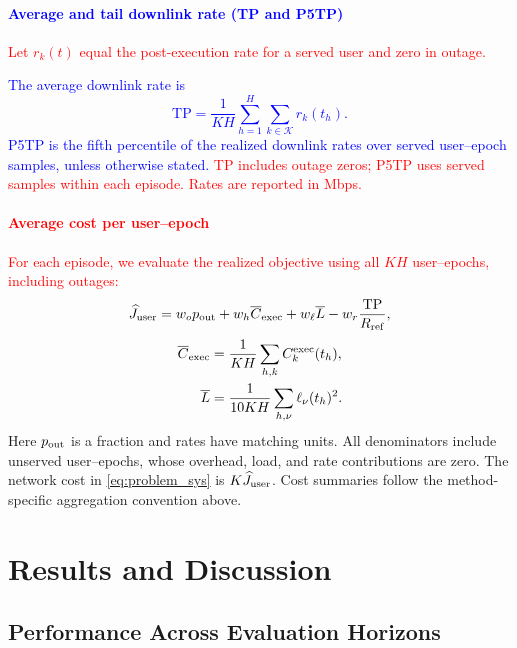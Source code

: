 \documentclass[10pt,letterpaper,journal]{IEEEtran}
\newcommand{\revnew}[1]{\textcolor{red}{#1}}
\begin{document}
\paragraph{\textcolor{blue}{Average and tail downlink rate (TP and P5TP)}}

\revnew{Let $r_k(t)$ equal the post-execution rate for a served user and zero in outage.}

\textcolor{blue}{The average downlink rate is
\begin{equation}
\mathrm{TP}
=
\frac{1}{KH}
\sum_{h=1}^{H}\sum_{k\in\mathcal K}r_k(t_h).
\end{equation}
P5TP is the fifth percentile of the realized downlink rates over served user--epoch samples, unless otherwise stated.}
\revnew{TP includes outage zeros; P5TP uses served samples within each episode. Rates are reported in Mbps.}


\paragraph{\revnew{Average cost per user--epoch}}
\revnew{For each episode, we evaluate the realized objective using all $KH$ user--epochs, including outages:}
\begingroup\color{red}
\[
\widehat J_{\rm user}
=w_o p_{\rm out}+w_h\overline C_{\rm exec}
+w_\ell\overline L-w_r\frac{\mathrm{TP}}{R_{\rm ref}},
\]
\[
\begin{aligned}
\overline C_{\rm exec}&=\frac{1}{KH}\sum_{h,k}C_k^{\rm exec}(t_h),\\
\overline L&=\frac{1}{10KH}\sum_{h,\nu}\ell_\nu(t_h)^2.
\end{aligned}
\]
Here $p_{\rm out}$ is a fraction and rates have matching units. All denominators include unserved user--epochs, whose overhead, load, and rate contributions are zero. The network cost in \eqref{eq:problem_sys} is $K\widehat J_{\rm user}$. Cost summaries follow the method-specific aggregation convention above.
\endgroup







\section{Results and Discussion}
\label{Results}

\subsection{Performance Across Evaluation Horizons}
\label{subsec:results_overall_nominal}
\end{document}
